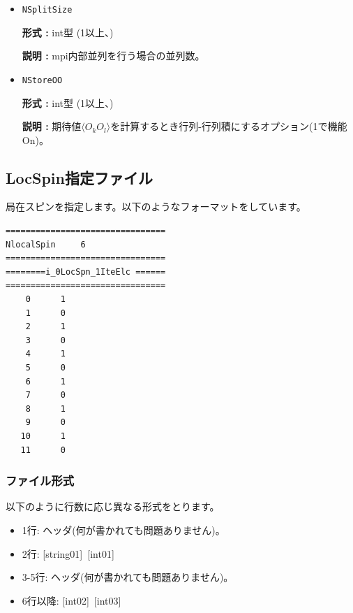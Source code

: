 \begin{itemize}
{\bf 説明 :} 乱数の初期seed。\verb|RndSeed|

 \item \verb|NSplitSize|

{\bf 形式 :} int型 (1以上、)

{\bf 説明 :} mpi内部並列を行う場合の並列数。

\item \verb|NStoreOO|

{\bf 形式 :} int型 (1以上、)

{\bf 説明 :} 期待値$\langle O_k O_l \rangle$を計算するとき行列-行列積にするオプション(1で機能On)。
 
 \end{itemize}


\newpage
\subsection{LocSpin指定ファイル}
\label{Subsec:locspn}
局在スピンを指定します。以下のようなフォーマットをしています。\\
\begin{minipage}{10cm}
\begin{screen}
\begin{verbatim}
================================ 
NlocalSpin     6  
================================ 
========i_0LocSpn_1IteElc ====== 
================================ 
    0      1
    1      0
    2      1
    3      0
    4      1
    5      0
    6      1
    7      0
    8      1
    9      0
   10      1
   11      0
\end{verbatim}
\end{screen}
\end{minipage}


\subsubsection{ファイル形式}
以下のように行数に応じ異なる形式をとります。
 \begin{itemize}
   \item  1行:  ヘッダ(何が書かれても問題ありません)。
   \item  2行:   [string01]~[int01]
   \item  3-5行:  ヘッダ(何が書かれても問題ありません)。
   \item  6行以降:  [int02]~[int03]
  \end{itemize}
